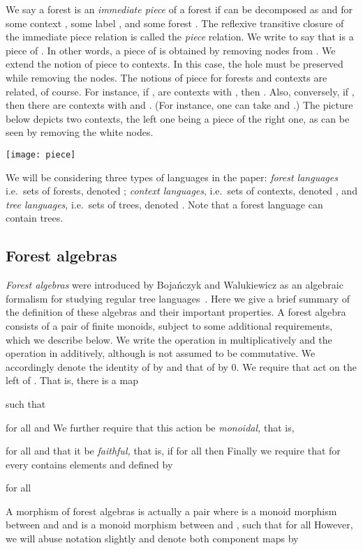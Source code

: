 \documentclass{LMCS}
\begin{document}
We say a forest  is an \emph{immediate piece} of a forest  if
 can be decomposed as  and  for some context ,
some label , and some forest . The reflexive transitive closure
of the immediate piece relation is called the \emph{piece}
relation. We write  to say that  is a piece of . In
other words, a piece of  is obtained by removing nodes from .
We extend the notion of piece to contexts. In this case, the hole must
be preserved while removing the nodes. The notions of piece for
forests and contexts are related, of course. For instance, if , 
are contexts with , then . Also, conversely,
if , then there are contexts  with  and
. (For instance, one can take  and .)
The picture below depicts two contexts, the left one being a piece of
the right one, as can be seen by removing the white nodes.
\medskip
\begin{center}
  \texttt{[image: piece]}
 \end{center}
We will be considering three types of languages in the paper:
 \emph{forest languages} i.e.~sets of forests, denoted ;
 \emph{context languages}, i.e.~sets of contexts, denoted , and
 \emph{tree languages}, i.e.~sets of trees, denoted . Note that a
 forest language can contain trees.

\subsection{Forest algebras}
\label{sec:forest-algebra}
{\it Forest algebras} were introduced by Boja\'nczyk and Walukiewicz as an
algebraic formalism for studying regular tree languages~\cite{forestalgebra}.  Here
we give a brief summary of the definition of these algebras and their important
properties.  A forest algebra consists of a pair  of finite monoids,
subject to some additional requirements, which we describe below.  We write the
operation in  multiplicatively and the operation in  additively, although
 is not assumed to be commutative.  We accordingly denote the identity of
 by  and that of  by 0.
We require that  act on the left of .  That is, there is a map
 
 such that 
 
 for all  and  We further require that this action be {\it
   monoidal,} that is,

 for all  and that it be {\it faithful,} that is,
 if  for all  then 
Finally we require that for every   contains elements 
 and  defined by
 
 for all 

 A morphism  of forest algebras is actually a
 pair  where  is a monoid morphism between  and
  and  is a monoid morphism between  and , such that
  for all   However, we will
 abuse notation slightly and denote both component maps by 
\end{document}
